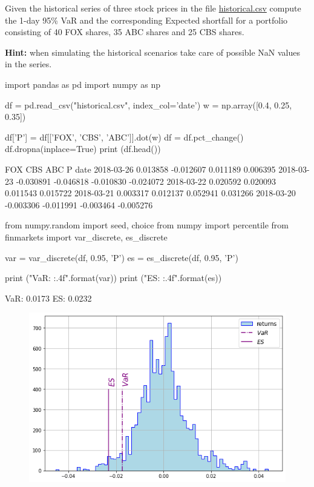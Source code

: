 \begin{question}
Given the historical series of three stock prices in the file \href{https://raw.githubusercontent.com/matteosan1/finance_course/master/input_files/historical.csv}{historical.csv} compute the 1-day 95\% VaR and the corresponding Expected shortfall for a portfolio consisting of 40 FOX shares, 35 ABC shares and 25 CBS shares. 

\noindent\textbf{Hint:} when simulating the historical scenarios take care of possible NaN values in the series.
\end{question}

\cprotEnv\begin{solution}
\begin{ipython}
import pandas as pd
import numpy as np

df = pd.read_csv("historical.csv", index_col='date')
w = np.array([0.4, 0.25, 0.35])

df['P'] = df[['FOX', 'CBS', 'ABC']].dot(w)
df = df.pct_change()
df.dropna(inplace=True)
print (df.head())
\end{ipython}
\begin{ioutput}
                 FOX       CBS       ABC         P
date                                              
2018-03-26  0.013858 -0.012607  0.011189  0.006395
2018-03-23 -0.030891 -0.046818 -0.010830 -0.024072
2018-03-22  0.020592  0.020093  0.011543  0.015722
2018-03-21  0.003317  0.012137  0.052941  0.031266
2018-03-20 -0.003306 -0.011991 -0.003464 -0.005276
\end{ioutput}
\begin{ipython}
from numpy.random import seed, choice
from numpy import percentile
from finmarkets import var_discrete, es_discrete
 
var = var_discrete(df, 0.95, 'P')
es = es_discrete(df, 0.95, 'P')

print ("VaR: {:.4f}".format(var))
print ("ES: {:.4f}".format(es))
\end{ipython}
\begin{ioutput}
VaR: 0.0173
ES: 0.0232
\end{ioutput}
\begin{figure}[htbp]
\centering
\includegraphics[width=0.7\linewidth]{figures/hist_var_ex}
\end{figure}
\end{solution}

